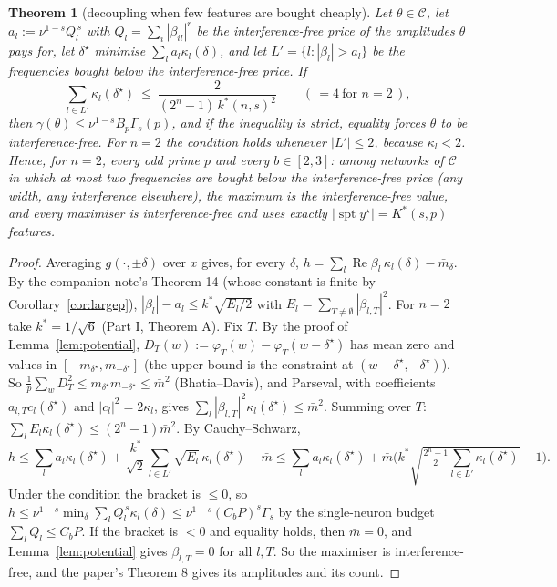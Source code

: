 \documentclass[11pt]{article}
\newtheorem{theorem}{Theorem}
\theoremstyle{definition}
\renewcommand{\Re}{\operatorname{Re}}
\begin{document}
\begin{theorem}[decoupling when few features are bought cheaply]\label{thm:loc}
Let $\theta\in\mathcal C$, let $a_l:=\nu^{1-s}Q_l^{\,s}$ with $Q_l=\sum_{i}|\beta_{il}|^r$ be the interference-free price of the
amplitudes $\theta$ pays for, let $\delta^\star$ minimise $\sum_la_l\kappa_l(\delta)$, and let $L'=\{l:|\beta_l|>a_l\}$ be the
frequencies bought \emph{below} the interference-free price.  If
\[\sum_{l\in L'}\kappa_l(\delta^\star)\ \le\ \frac{2}{(2^n-1)\,k^*(n,s)^2}\qquad(\,=4\ \text{for }n=2\,),\]
then $\gamma(\theta)\le\nu^{1-s}B_p\Gamma_s(p)$, and if the inequality is strict, equality forces $\theta$ to be
interference-free.  For $n=2$ the condition holds whenever $|L'|\le2$, because $\kappa_l<2$.  Hence, for $n=2$, every odd
prime $p$ and every $b\in[2,3]$: among networks of $\mathcal C$ in which at most two frequencies are bought below the
interference-free price (any width, any interference elsewhere), the maximum is the interference-free value, and every
maximiser is interference-free and uses exactly $|\operatorname{spt}y^\star|=K^*(s,p)$ features.
\end{theorem}
\begin{proof}
Averaging $g(\cdot,\pm\delta)$ over $x$ gives, for every $\delta$, $h=\sum_l\Re\beta_l\,\kappa_l(\delta)-\bar m_\delta$.  By the
companion note's Theorem 14 (whose constant is finite by Corollary~\ref{cor:largep}),
$|\beta_l|-a_l\le k^*\sqrt{E_l/2}$ with $E_l=\sum_{T\ne\emptyset}|\beta_{l,T}|^2$.  For $n=2$ take $k^*=1/\sqrt6$ (Part I, Theorem A).
Fix $T$.  By the proof of Lemma~\ref{lem:potential}, $D_T(w):=\varphi_T(w)-\varphi_T(w-\delta^\star)$ has mean zero and values in
$[-m_{\delta^\star},m_{-\delta^\star}]$ (the upper bound is the constraint at $(w-\delta^\star,-\delta^\star)$).  So
$\frac1p\sum_wD_T^2\le m_{\delta^\star}m_{-\delta^\star}\le\bar m^2$ (Bhatia--Davis), and Parseval, with coefficients
$a_{l,T}c_l(\delta^\star)$ and $|c_l|^2=2\kappa_l$, gives $\sum_l|\beta_{l,T}|^2\kappa_l(\delta^\star)\le\bar m^2$.  Summing over $T$:
$\sum_lE_l\kappa_l(\delta^\star)\le(2^n-1)\bar m^2$.  By Cauchy--Schwarz,
\[h\le\sum_la_l\kappa_l(\delta^\star)+\frac{k^*}{\sqrt2}\sum_{l\in L'}\sqrt{E_l}\,\kappa_l(\delta^\star)-\bar m
\le\sum_la_l\kappa_l(\delta^\star)+\bar m\Big(k^*\sqrt{\tfrac{2^n-1}2\textstyle\sum_{l\in L'}\kappa_l(\delta^\star)}-1\Big).\]
Under the condition the bracket is $\le0$, so $h\le\nu^{1-s}\min_\delta\sum_lQ_l^{\,s}\kappa_l(\delta)\le\nu^{1-s}(C_bP)^s\Gamma_s$
by the single-neuron budget $\sum_lQ_l\le C_bP$.  If the bracket is $<0$ and equality holds, then $\bar m=0$, and
Lemma~\ref{lem:potential} gives $\beta_{l,T}=0$ for all $l,T$.  So the maximiser is interference-free, and the paper's
Theorem 8 gives its amplitudes and its count.
\end{proof}
\end{document}
